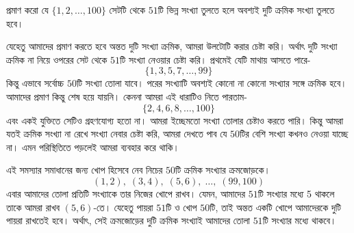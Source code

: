 \begin{example}
	প্রমাণ করো যে $\{1,2,\ldots,100\}$ সেটটি থেকে $51$টি ভিন্ন সংখ্যা তুলতে হলে অবশ্যই দুটি ক্রমিক সংখ্যা তুলতে হবে।
\end{example}
\begin{solution}
	যেহেতু আমাদের প্রমাণ করতে হবে অন্তত দুটি সংখ্যা ক্রমিক, আমরা উলটোটি করার চেষ্টা করি। অর্থাৎ দুটি সংখ্যা ক্রমিক না নিয়ে ওপরের সেট থেকে $51$টি সংখ্যা নেওয়ার চেষ্টা করি। প্রথমেই যেটি মাথায় আসতে পারে-
	\[\{1, 3, 5, 7,\ldots, 99\}\]
	কিন্তু এভাবে সর্বোচ্চ $50$টি সংখ্যা তোলা যাবে। পরের সংখ্যাটি অবশ্যই কোনো না কোনো সংখ্যার সঙ্গে ক্রমিক হবে। আমাদের প্রমাণ কিন্তু শেষ হয়ে যায়নি। কেননা আমরা এই ধারাটিও নিতে পারতাম-
	\[\{2, 4, 6, 8, \ldots, 100\}\]
	এবং একই যুক্তিতে সেটিও গ্রহণযোগ্য হতো না। আমরা ইচ্ছেমতো সংখ্যা তোলার চেষ্টাও করতে পারি। কিন্তু আমরা যতই ক্রমিক সংখ্যা না রেখে সংখ্যা নেবার চেষ্টা করি, আমরা দেখতে পাব যে $50$টির বেশি সংখ্যা কখনও নেওয়া যাচ্ছে না। এমন পরিস্থিতিতে পড়লেই আমরা \phpname{} ব্যবহার করে থাকি।

	এই সমস্যার সমাধানের জন্য খোপ হিসেবে নেব নিচের $50$টি ক্রমিক সংখ্যার ক্রমজোড়কে।
	\[(1, 2),\;(3, 4),\;(5, 6),\;\ldots,\;(99, 100)\]
	এবার আমাদের তোলা প্রতিটি সংখ্যাকে তার নিজের খোপে রাখব। যেমন, আমাদের $51$টি সংখ্যার মধ্যে 5 থাকলে তাকে আমরা রাখব $(5,6)$-তে। যেহেতু পায়রা $51$টি ও খোপ $50$টি, তাই অন্তত একটি খোপে আমাদেরকে দুটি পায়রা রাখতেই হবে। অর্থাৎ, সেই ক্রমজোড়ের দুটি ক্রমিক সংখ্যাই আমাদের তোলা $51$টি সংখ্যার মধ্যে থাকবে।
\end{solution}

